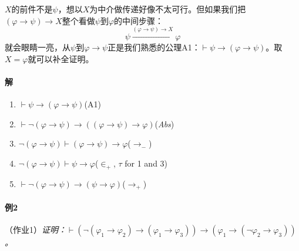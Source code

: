 \documentclass[b5paper,oneside]{ctexbook}
\begin{document}
$X$的前件不是$\psi$，想以$X$为中介做传递好像不太可行。但如果我们把$(\varphi\rightarrow\psi)\rightarrow X$整个看做$\psi$到$\varphi$的中间步骤：
\[\psi\xrightarrow{(\varphi\to\psi)\to X}\varphi\]
就会眼睛一亮，从$\psi$到$\varphi\to\psi$正是我们熟悉的公理A1：$\vdash\psi\to(\varphi\to\psi)$。取$X=\varphi$就可以补全证明。
\paragraph{解}\begin{enumerate}
\item $\vdash \psi\rightarrow (\varphi\rightarrow\psi )$\hfill (A1)
\item $\vdash \neg (\varphi\rightarrow\psi)\rightarrow ((\varphi\rightarrow\psi)\rightarrow\varphi)$\hfill (\textit{Abs})
\item $\neg (\varphi\rightarrow\psi)\vdash (\varphi\rightarrow\psi)\rightarrow\varphi$\hfill ($\rightarrow_-$)
\item $\neg (\varphi\rightarrow\psi)\vdash \psi\rightarrow\varphi$\hfill ($\in_+$, $\tau$ for 1 and 3)
\item $\vdash\neg(\varphi\rightarrow\psi)\rightarrow(\psi\rightarrow\varphi)$\hfill ($\rightarrow_+$)
\end{enumerate}
\paragraph{例2}（作业1）\textit{证明：$\vdash(\neg (\varphi_1\rightarrow\varphi_2)\rightarrow (\varphi_1\rightarrow\varphi_3))\rightarrow (\varphi_1\rightarrow (\neg\varphi_2\rightarrow\varphi_3))$。}
\end{document}
